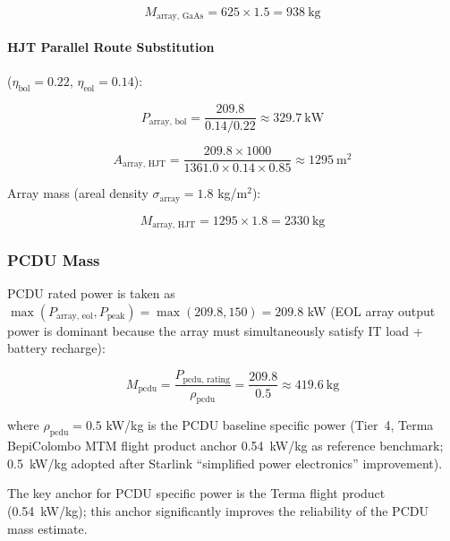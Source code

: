 \begin{equation}
  M_{\text{array, GaAs}} = 625 \times 1.5 = 938\ \text{kg}
\end{equation}

\paragraph{HJT Parallel Route Substitution} ($\eta_{\text{bol}} = 0.22$, $\eta_{\text{eol}} = 0.14$):

\begin{equation}
  P_{\text{array, bol}} = \frac{209.8}{0.14/0.22} \approx 329.7\ \text{kW}
\end{equation}

\begin{equation}
  A_{\text{array, HJT}} = \frac{209.8 \times 1000}{1361.0 \times 0.14 \times 0.85} \approx 1295\ \text{m}^{2}
\end{equation}

Array mass (areal density $\sigma_{\text{array}} = 1.8$ kg/m$^2$):

\begin{equation}
  M_{\text{array, HJT}} = 1295 \times 1.8 = 2330\ \text{kg}
\end{equation}

\subsubsection{PCDU Mass}

PCDU rated power is taken as $\max(P_{\text{array, eol}}, P_{\text{peak}}) = \max(209.8, 150) = 209.8$ kW (EOL array output power is dominant because the array must simultaneously satisfy IT load + battery recharge):

\begin{equation}
  M_{\text{pcdu}} = \frac{P_{\text{pcdu, rating}}}{\rho_{\text{pcdu}}}
                   = \frac{209.8}{0.5} \approx 419.6\ \text{kg}
  \label{eq:pcdu-mass}
\end{equation}

where $\rho_{\text{pcdu}} = 0.5$ kW/kg is the PCDU baseline specific power (Tier~4, Terma BepiColombo MTM flight product anchor 0.54~kW/kg as reference benchmark; 0.5~kW/kg adopted after Starlink ``simplified power electronics'' improvement).

The key anchor for PCDU specific power is the Terma flight product (0.54~kW/kg); this anchor significantly improves the reliability of the PCDU mass estimate.

